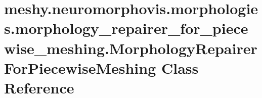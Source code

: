 \hypertarget{classmeshy_1_1neuromorphovis_1_1morphologies_1_1morphology__repairer__for__piecewise__meshing_1_5044f04bfe44b29f28cb83006490b999}{}\section{meshy.\+neuromorphovis.\+morphologies.\+morphology\+\_\+repairer\+\_\+for\+\_\+piecewise\+\_\+meshing.\+Morphology\+Repairer\+For\+Piecewise\+Meshing Class Reference}
\label{classmeshy_1_1neuromorphovis_1_1morphologies_1_1morphology__repairer__for__piecewise__meshing_1_5044f04bfe44b29f28cb83006490b999}


 


